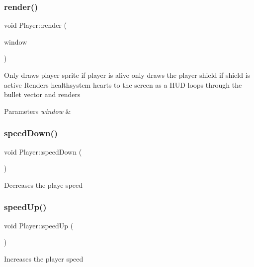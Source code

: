 \subsubsection{\texorpdfstring{render()}{render()}}
{\footnotesize\ttfamily void Player\+::render (\begin{DoxyParamCaption}\item[{sf\+::\+Render\+Window \&}]{window }\end{DoxyParamCaption})}



Only draws player sprite if player is alive only draws the player shield if shield is active Renders healthsystem hearts to the screen as a H\+UD loops through the bullet vector and renders 


\begin{DoxyParams}{Parameters}
{\em window} & \\
\hline
\end{DoxyParams}
\mbox{\label{class_player_a0a416eba4d3682c7a527d0639cfb2644}} 
\subsubsection{\texorpdfstring{speedDown()}{speedDown()}}
{\footnotesize\ttfamily void Player\+::speed\+Down (\begin{DoxyParamCaption}{ }\end{DoxyParamCaption})}



Decreases the playe speed 

\mbox{\label{class_player_ade1fb063559bb1ae1a07bf407cdeb5af}} 
\subsubsection{\texorpdfstring{speedUp()}{speedUp()}}
{\footnotesize\ttfamily void Player\+::speed\+Up (\begin{DoxyParamCaption}{ }\end{DoxyParamCaption})}



Increases the player speed 

\mbox{\label{class_player_a825e707c1bf75f4488c11997be6adadc}} 
